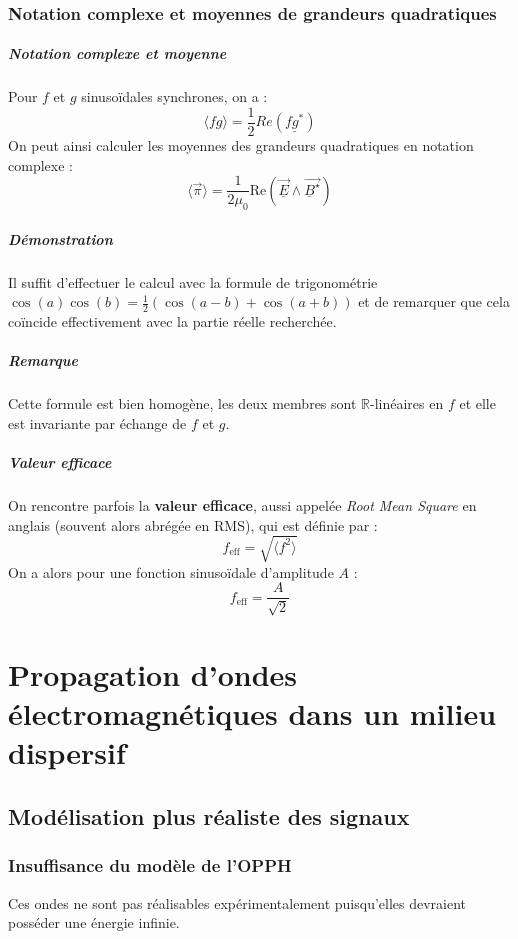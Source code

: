 \documentclass[french]{book}
\theoremstyle{plain}
\theoremstyle{definition}
\theoremstyle{remark}
\newcommand{\R}{\mathbb{R}}
\newcommand{\st}{^*}
\begin{document}
\subsection{Notation complexe et moyennes de grandeurs quadratiques}
\paragraph{Notation complexe et moyenne} Pour $f$ et $g$ sinusoïdales synchrones, on a : $$\langle fg\rangle=\frac12Re\left(\underline{fg\st}\right)$$ On peut ainsi calculer les moyennes des grandeurs quadratiques en notation complexe : $$\langle \overrightarrow{\pi}\rangle=\frac{1}{2\mu_0}\text{Re}\left( \overrightarrow{\underline{E}}\wedge\overrightarrow{\underline{B}^\star}\right)$$
\paragraph{Démonstration} Il suffit d'effectuer le calcul avec la formule de trigonométrie $\cos(a)\cos(b)=\frac{1}{2}\left(\cos(a-b)+\cos(a+b)\right)$ et de remarquer que cela coïncide effectivement avec la partie réelle recherchée.
\paragraph{Remarque} Cette formule est bien homogène, les deux membres sont $\R$-linéaires en $f$ et elle est invariante par échange de $f$ et $g$.
\paragraph{Valeur efficace} On rencontre parfois la \textbf{valeur efficace}, aussi appelée \textit{Root Mean Square} en anglais (souvent alors abrégée en RMS), qui est définie par : $$f_\text{eff}=\sqrt{\langle f^2\rangle}$$ On a alors pour une fonction sinusoïdale d'amplitude $A$ : $$f_\text{eff}=\frac{A}{\sqrt{2}}$$
\chapter{Propagation d'ondes électromagnétiques dans un milieu dispersif}
\localtableofcontents
\section{Modélisation plus réaliste des signaux}
\subsection{Insuffisance du modèle de l'OPPH}
Ces ondes ne sont pas réalisables expérimentalement puisqu'elles devraient posséder une énergie infinie.
\end{document}
